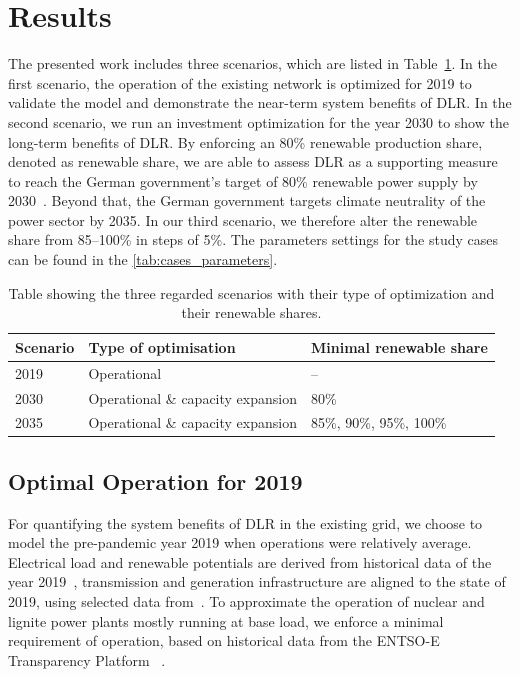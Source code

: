 \documentclass[preprint,12pt]{elsarticle}
\begin{document}
\section{Results}
\label{sec:results}

The presented work includes three scenarios, which are listed in Table~\ref{tab:scenarios}. In the first scenario, the operation of the existing network is optimized for 2019 to validate the model and demonstrate the near-term system benefits of DLR. In the second scenario, we run an investment optimization for the year 2030 to show the long-term benefits of DLR.
By enforcing an 80\% renewable production share, denoted as renewable share, we are able to assess DLR as a supporting measure to reach the German government's target of 80\% renewable power supply by 2030~\cite{federalministryofeconomicaffairsandclimateactionGermanyCurrentClimate2022}. Beyond that, the German government targets climate neutrality of the power sector by 2035. In our third scenario, we therefore alter the renewable share from 85--100\% in steps of 5\%. The parameters settings for the study cases can be found in the \ref{tab:cases_parameters}.

\begin{table}[!h]
    \begin{tabular}{lll}
        Scenario & Type of optimisation & Minimal renewable share\\
        \hline
       2019 & Operational & -- \\
       2030 & Operational \& capacity expansion & 80\% \\
       2035 & Operational \& capacity expansion & 85\%, 90\%, 95\%, 100\% \\
       \hline
    \end{tabular}
    \caption{Table showing the three regarded scenarios with their type of optimization and their renewable shares.}
    \label{tab:scenarios}
\end{table}

\subsection{Optimal Operation for 2019}
For quantifying the system benefits of DLR in the existing grid, we choose to model the pre-pandemic year 2019 when operations were relatively average. Electrical load and renewable potentials are derived from historical data of the year 2019~\cite{muehlenpfordtTimeSeries2020}, transmission and generation infrastructure are aligned to the state of 2019, using selected data from~\cite{hofmannFRESNAPowerplantmatchingV02022,openpowersystemdataDataPackageNational2017,wiegmansGridkitExtractEntsoE2016}. To approximate the operation of nuclear and lignite power plants mostly running at base load, we enforce a minimal requirement of operation, based on historical data from the ENTSO-E Transparency Platform ~\cite{entso-eENTSOETransparencyPlatform2020}.
\end{document}
